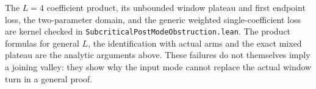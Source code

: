 The $L=4$ coefficient product, its unbounded window
plateau and first endpoint loss, the two-parameter domain,
and the generic
weighted single-coefficient loss are kernel checked in
\texttt{SubcriticalPostModeObstruction.lean}.
The product formulas for general $L$, the identification
with actual arms and the exact mixed plateau are the
analytic arguments above.
These failures do not themselves imply a joining valley:
they show why the input mode cannot replace the actual
window turn in a general proof.

